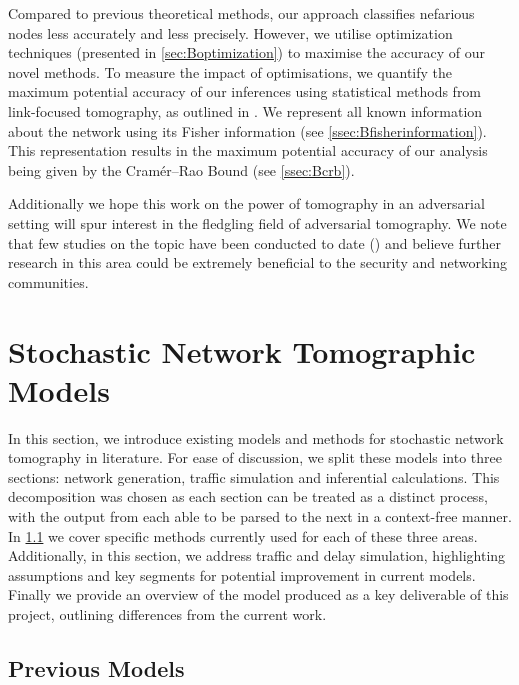 Compared to previous theoretical methods, our approach classifies nefarious nodes less accurately and less precisely. However, we utilise optimization techniques (presented in \cref{sec:Boptimization}) to maximise the accuracy of our novel methods. To measure the impact of optimisations, we quantify the maximum potential accuracy of our inferences using statistical methods from link-focused tomography, as outlined in \cite{he_fisher_2015}. We represent all known information about the network using its Fisher information (see \cref{ssec:Bfisherinformation}). This representation results in the maximum potential accuracy of our analysis being given by the Cramér–Rao Bound (see \cref{ssec:Bcrb}).\par
Additionally we hope this work on the power of tomography in an adversarial setting will spur interest in the fledgling field of adversarial tomography. We note that few studies on the topic have been conducted to date (\cite{he_network_2021}) and believe further research in this area could be extremely beneficial to the security and networking communities.

\section{Stochastic Network Tomographic Models}
\label{sec:Imodels}

In this section, we introduce existing models and methods for stochastic network tomography in literature. For ease of discussion, we split these models into three sections: network generation, traffic simulation and inferential calculations. This decomposition was chosen as each section can be treated as a distinct process, with the output from each able to be parsed to the next in a context-free manner. In \cref{ssec:Icurrentmodels} we cover specific methods currently used for each of these three areas. Additionally, in this section, we address traffic and delay simulation, highlighting assumptions and key segments for potential improvement in current models. Finally we provide an overview of the model produced as a key deliverable of this project, outlining differences from the current work.

\subsection{Previous Models}
\label{ssec:Icurrentmodels}

